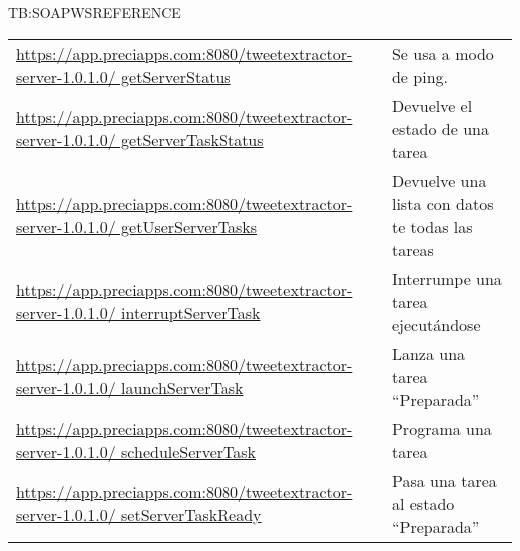 \begin{table}[Referencia de servicios web SOAP de TweetExtractorServer]{TB:SOAPWSREFERENCE}
\begin{tabular}{|p{10cm}|p{7cm}|}
	\href{https://app.preciapps.com:8080/tweetextractor-server-1.0.1.0/getServerStatus?wsdl}{https://app.preciapps.com:8080/tweetextractor-server-1.0.1.0/ getServerStatus} & Se usa a modo de ping. \\
	\href{https://app.preciapps.com:8080/tweetextractor-server-1.0.1.0/getServerTaskStatus?wsdl}{https://app.preciapps.com:8080/tweetextractor-server-1.0.1.0/ getServerTaskStatus} & Devuelve el estado de una tarea \\
	\href{https://app.preciapps.com:8080/tweetextractor-server-1.0.1.0/getUserServerTasks?wsdl}{https://app.preciapps.com:8080/tweetextractor-server-1.0.1.0/ getUserServerTasks} & Devuelve una lista con datos te todas las tareas \\
	\href{https://app.preciapps.com:8080/tweetextractor-server-1.0.1.0/interruptServerTask?wsdl}{https://app.preciapps.com:8080/tweetextractor-server-1.0.1.0/ interruptServerTask} &  Interrumpe una tarea ejecutándose\\
	\href{https://app.preciapps.com:8080/tweetextractor-server-1.0.1.0/launchServerTask?wsdl}{https://app.preciapps.com:8080/tweetextractor-server-1.0.1.0/ launchServerTask} &  Lanza una tarea ``Preparada''\\
	\href{https://app.preciapps.com:8080/tweetextractor-server-1.0.1.0/scheduleServerTask?wsdl}{https://app.preciapps.com:8080/tweetextractor-server-1.0.1.0/ scheduleServerTask} & Programa una tarea \\
	\href{https://app.preciapps.com:8080/tweetextractor-server-1.0.1.0/setServerTaskReady?wsdl}{https://app.preciapps.com:8080/tweetextractor-server-1.0.1.0/ setServerTaskReady} & Pasa una tarea al estado ``Preparada'' \\
	\hline \hline
	\hline
	\end{tabular}
\end{table}